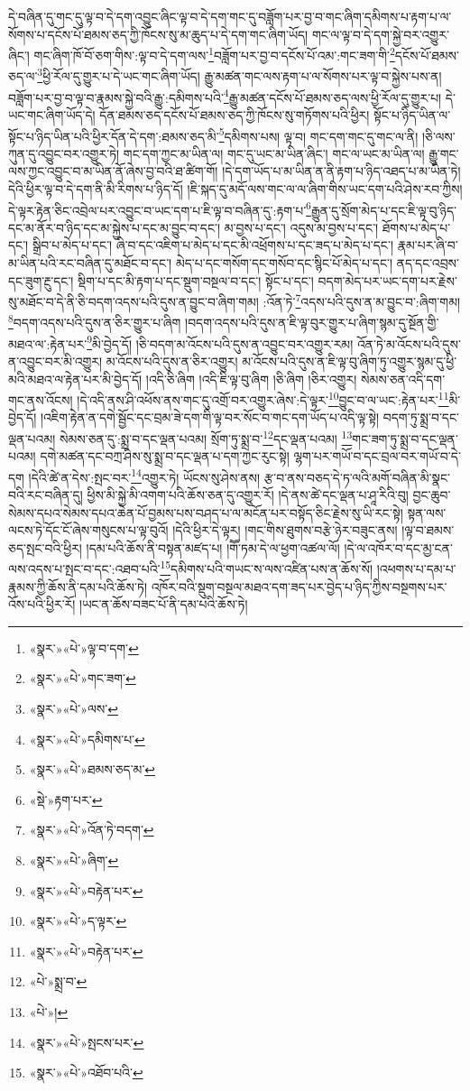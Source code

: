 དེ་བཞིན་དུ་གང་དུ་ལྟ་བ་དེ་དག་འབྱུང་ཞིང་ལྟ་བ་དེ་དག་གང་དུ་བཟློག་པར་བྱ་བ་གང་ཞིག་དམིགས་པ་རྟག་པ་ལ་སོགས་པ་དངོས་པོ་ཐམས་ཅད་ཀྱི་ཁོངས་སུ་མ་ཆུད་པ་དེ་དག་གང་ཞིག་ཡོད། གང་ལ་ལྟ་བ་དེ་དག་སྐྱེ་བར་འགྱུར་ཞིང་། གང་ཞིག་ཁོ་བོ་ཅག་གིས་:ལྟ་བ་དེ་དག་ལས་\footnote{«སྣར་»«པེ་»ལྟ་བ་དག་}བཟློག་པར་བྱ་བ་དངོས་པོ་འམ་:གང་ཟག་གི་\footnote{«སྣར་»«པེ་»གང་ཟག་}དངོས་པོ་ཐམས་ཅད་ལ་\footnote{«སྣར་»«པེ་»ལས་}ཕྱི་རོལ་དུ་གྱུར་པ་དེ་ཡང་གང་ཞིག་ཡོད། རྒྱུ་མཚན་གང་ལས་རྟག་པ་ལ་སོགས་པར་ལྟ་བ་སྐྱེས་པས་ན། བཟློག་པར་བྱ་བ་ལྟ་བ་རྣམས་སྐྱེ་བའི་རྒྱུ་:དམིགས་པའི་\footnote{«སྣར་»«པེ་»དམིགས་པ་}རྒྱུ་མཚན་དངོས་པོ་ཐམས་ཅད་ལས་ཕྱི་རོལ་དུ་གྱུར་པ། དེ་ཡང་གང་ཞིག་ཡོད་དེ། དོན་ཐམས་ཅད་དངོས་པོ་ཐམས་ཅད་ཀྱི་ཁོངས་སུ་གཏོགས་པའི་ཕྱིར། སྟོང་པ་ཉིད་ཡིན་ལ་སྟོང་པ་ཉིད་ཡིན་པའི་ཕྱིར་དོན་དེ་དག་:ཐམས་ཅད་མི་\footnote{«སྣར་»«པེ་»ཐམས་ཅད་མ་}དམིགས་པས། ལྟ་བ། གང་དག་གང་དུ་གང་ལ་ནི། །ཅི་ལས་ཀུན་དུ་འབྱུང་བར་འགྱུར་ཏེ། གང་དག་ཀྱང་མ་ཡིན་ལ། གང་དུ་ཡང་མ་ཡིན་ཞིང་། གང་ལ་ཡང་མ་ཡིན་ལ། རྒྱུ་གང་ལས་ཀྱང་འབྱུང་བ་མ་ཡིན་ནོ་ཞེས་བྱ་བའི་ཐ་ཚིག་གོ། །དེ་དག་ཡོད་པ་མ་ཡིན་ན་ནི་རྟག་པ་ཉིད་འཐད་པ་མ་ཡིན་ཏེ། དེའི་ཕྱིར་ལྟ་བ་དེ་དག་ནི་མི་རིགས་པ་ཉིད་དོ། །ཇི་སྐད་དུ་མདོ་ལས་གང་ལ་ལ་ཞིག་གིས་ཡང་དག་པའི་ཤེས་རབ་ཀྱིས། དེ་ལྟར་རྟེན་ཅིང་འབྲེལ་པར་འབྱུང་བ་ཡང་དག་པ་ཇི་ལྟ་བ་བཞིན་དུ་:རྟག་པ་\footnote{«སྡེ་»རྟག་པར་}རྒྱུན་དུ་སྲོག་མེད་པ་དང་ཇི་ལྟ་བུ་ཉིད་དང་མ་ནོར་བ་ཉིད་དང་མ་སྐྱེས་པ་དང་མ་བྱུང་བ་དང་། མ་བྱས་པ་དང་། འདུས་མ་བྱས་པ་དང་། ཐོགས་པ་མེད་པ་དང་། སྒྲིབ་པ་མེད་པ་དང་། ཞི་བ་དང་འཇིག་པ་མེད་པ་དང་མི་འཕྲོགས་པ་དང་ཟད་པ་མེད་པ་དང་། རྣམ་པར་ཞི་བ་མ་ཡིན་པའི་རང་བཞིན་དུ་མཐོང་བ་དང་། མེད་པ་དང་གསོག་དང་གསོབ་དང་སྙིང་པོ་མེད་པ་དང་། ནད་དང་འབྲས་དང་ཟུག་རྔུ་དང་། སྡིག་པ་དང་མི་རྟག་པ་དང་སྡུག་བསྔལ་བ་དང་། སྟོང་པ་དང་། བདག་མེད་པར་ཡང་དག་པར་རྗེས་སུ་མཐོང་བ་དེ་ནི་ཅི་བདག་འདས་པའི་དུས་ན་བྱུང་བ་ཞིག་གམ། :འོན་ཏེ་\footnote{«སྣར་»«པེ་»འོན་ཏེ་བདག་}འདས་པའི་དུས་ན་མ་བྱུང་བ་:ཞིག་གམ། \footnote{«སྣར་»«པེ་»ཞིག་}བདག་འདས་པའི་དུས་ན་ཅིར་གྱུར་པ་ཞིག །བདག་འདས་པའི་དུས་ན་ཇི་ལྟ་བུར་གྱུར་པ་ཞིག་སྙམ་དུ་སྔོན་གྱི་མཐའ་ལ་:རྟེན་པར་\footnote{«སྣར་»«པེ་»བརྟེན་པར་}མི་བྱེད་དོ། །ཅི་བདག་མ་འོངས་པའི་དུས་ན་འབྱུང་བར་འགྱུར་རམ། འོན་ཏེ་མ་འོངས་པའི་དུས་ན་འབྱུང་བར་མི་འགྱུར། མ་འོངས་པའི་དུས་ན་ཅིར་འགྱུར། མ་འོངས་པའི་དུས་ན་ཇི་ལྟ་བུ་ཞིག་ཏུ་འགྱུར་སྙམ་དུ་ཕྱི་མའི་མཐའ་ལ་རྟེན་པར་མི་བྱེད་དོ། །འདི་ཅི་ཞིག །འདི་ཇི་ལྟ་བུ་ཞིག །ཅི་ཞིག །ཅིར་འགྱུར། སེམས་ཅན་འདི་དག་གང་ནས་འོངས། །དེ་འདི་ནས་ཤི་འཕོས་ནས་གང་དུ་འགྲོ་བར་འགྱུར་ཞེས་:དེ་ལྟར་\footnote{«སྣར་»«པེ་»ད་ལྟར་}བྱུང་བ་ལ་ཡང་:རྟེན་པར་\footnote{«སྣར་»«པེ་»བརྟེན་པར་}མི་བྱེད་དོ། །འཇིག་རྟེན་ན་དགེ་སྦྱོང་དང་བྲམ་ཟེ་དག་གི་ལྟ་བར་སོང་བ་གང་དག་ཡོད་པ་འདི་ལྟ་སྟེ། བདག་ཏུ་སྨྲ་བ་དང་ལྡན་པའམ། སེམས་ཅན་དུ་:སྨྲ་བ་དང་ལྡན་པའམ། སྲོག་ཏུ་སྨྲ་བ་\footnote{«པེ་»སྨྲ་བ་}དང་ལྡན་པའམ། \footnote{«པེ་»།  }གང་ཟག་ཏུ་སྨྲ་བ་དང་ལྡན་པའམ། དགེ་མཚན་དང་བཀྲ་ཤིས་སུ་སྨྲ་བ་དང་ལྡན་པ་དག་ཀྱང་རུང་སྟེ། ལྷག་པར་གཡོ་བ་དང་བྲལ་བར་གཡོ་བ་དེ་དག །དེའི་ཚེ་ན་དེས་:སྤང་བར་\footnote{«སྣར་»«པེ་»སྤངས་པར་}འགྱུར་ཏེ། ཡོངས་སུ་ཤེས་ནས། རྩ་བ་ནས་བཅད་དེ་ཏ་ལའི་མགོ་བཞིན་མི་སྣང་བའི་རང་བཞིན་དུ། ཕྱིས་མི་སྐྱེ་མི་འགག་པའི་ཆོས་ཅན་དུ་འགྱུར་རོ། །དེ་ནས་ཚེ་དང་ལྡན་པ་ཤཱ་རིའི་བུ། བྱང་ཆུབ་སེམས་དཔའ་སེམས་དཔའ་ཆེན་པོ་བྱམས་པས་བཤད་པ་ལ་མངོན་པར་བསྟོད་ཅིང་རྗེས་སུ་ཡི་རང་སྟེ། སྟན་ལས་ལངས་ཏེ་དོང་ངོ་ཞེས་གསུངས་པ་ལྟ་བུའོ། །དེའི་ཕྱིར་དེ་ལྟར། །གང་གིས་ཐུགས་བརྩེ་ཉེར་བཟུང་ནས། །ལྟ་བ་ཐམས་ཅད་སྤང་བའི་ཕྱིར། །དམ་པའི་ཆོས་ནི་བསྟན་མཛད་པ། །གཽ་ཏམ་དེ་ལ་ཕྱག་འཚལ་ལོ། །དེ་ལ་འཁོར་བ་དང་མྱ་ངན་ལས་འདས་པ་སྤང་བ་དང་:འཐབ་པའི་\footnote{«སྣར་»«པེ་»འཐོབ་པའི་}དམིགས་པའི་གཡང་ས་ལས་འཛིན་པས་ན་ཆོས་སོ། །འཕགས་པ་དམ་པ་རྣམས་ཀྱི་ཆོས་ནི་དམ་པའི་ཆོས་ཏེ། འཁོར་བའི་སྡུག་བསྔལ་མཐའ་དག་ཟད་པར་བྱེད་པ་ཉིད་ཀྱིས་བསྔགས་པར་འོས་པའི་ཕྱིར་རོ། །ཡང་ན་ཆོས་བཟང་པོ་ནི་དམ་པའི་ཆོས་ཏེ། 